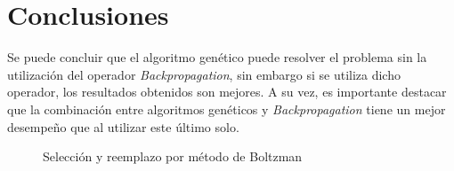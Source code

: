 \documentclass{sig-alternate}
\begin{document}
		
		\section{Conclusiones}
		
		Se puede concluir que el algoritmo genético puede resolver el problema sin la utilización del operador \textit{Backpropagation}, sin embargo si se utiliza dicho operador, los resultados obtenidos son mejores.
		A su vez, es importante destacar que la combinación entre algoritmos genéticos y \textit{Backpropagation} tiene un mejor desempeño que al utilizar este último solo.

\clearpage
\onecolumn


\begin{figure}[!ht]
	\begin{center}
	\end{center}
	\caption{Selección y reemplazo por método de Boltzman}
	\label{fig:boltzboltz}
\end{figure}
\end{document}
